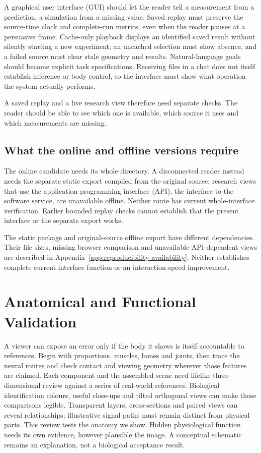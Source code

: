 A graphical user interface (GUI) should let the reader tell a measurement from a prediction, a simulation from a missing value. Saved replay must preserve the source-time clock and complete-run metrics, even when the reader pauses at a persuasive frame. Cache-only playback displays an identified saved result without silently starting a new experiment; an uncached selection must show absence, and a failed source must clear stale geometry and results. Natural-language goals should become explicit task specifications. Receiving files in a chat does not itself establish inference or body control, so the interface must show what operation the system actually performs.\par

A saved replay and a live research view therefore need separate checks. The reader should be able to see which one is available, which source it uses and which measurements are missing.\par

\subsection{What the online and offline versions require}

The online candidate needs its whole directory. A disconnected reader instead
needs the separate static export compiled from the original source; research
views that use the application programming interface (API), the interface to
the software service, are unavailable offline. Neither route has current
whole-interface verification. Earlier bounded replay checks cannot establish
that the present interface or the separate export works.\par

The static package and original-source offline export have different dependencies. Their file sizes, missing browser comparison and unavailable API-dependent views are described in Appendix~\ref{app:reproducibility-availability}. Neither establishes complete current interface function or an interaction-speed improvement.\par

\section{Anatomical and Functional Validation}

A viewer can expose an error only if the body it shows is itself accountable to references. Begin with proportions, muscles, bones and joints, then trace the neural routes and check contact and viewing geometry wherever those features are claimed. Each component and the assembled scene need lifelike three-dimensional review against a series of real-world references. Biological identification colours, useful close-ups and tilted orthogonal views can make those comparisons legible. Transparent layers, cross-sections and paired views can reveal relationships; illustrative signal paths must remain distinct from physical parts. This review tests the anatomy we show. Hidden physiological function needs its own evidence, however plausible the image. A conceptual schematic remains an explanation, not a biological acceptance result.\par

